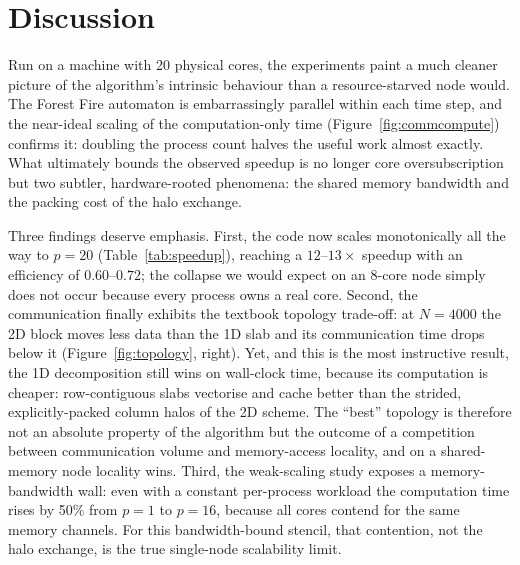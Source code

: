 \section{Discussion}
Run on a machine with 20 physical cores, the experiments paint a much cleaner picture of the algorithm's intrinsic behaviour than a resource-starved node would. The Forest Fire automaton is embarrassingly parallel within each time step, and the near-ideal scaling of the computation-only time (Figure~\ref{fig:commcompute}) confirms it: doubling the process count halves the useful work almost exactly. What ultimately bounds the observed speedup is no longer core oversubscription but two subtler, hardware-rooted phenomena: the shared memory bandwidth and the packing cost of the halo exchange.

Three findings deserve emphasis. First, the code now scales monotonically all the way to $p = 20$ (Table~\ref{tab:speedup}), reaching a $12$--$13\times$ speedup with an efficiency of $0.60$--$0.72$; the collapse we would expect on an 8-core node simply does not occur because every process owns a real core. Second, the communication finally exhibits the textbook topology trade-off: at $N = 4000$ the 2D block moves less data than the 1D slab and its communication time drops below it (Figure~\ref{fig:topology}, right). Yet, and this is the most instructive result, the 1D decomposition still wins on wall-clock time, because its computation is cheaper: row-contiguous slabs vectorise and cache better than the strided, explicitly-packed column halos of the 2D scheme. The ``best'' topology is therefore not an absolute property of the algorithm but the outcome of a competition between communication volume and memory-access locality, and on a shared-memory node locality wins. Third, the weak-scaling study exposes a memory-bandwidth wall: even with a constant per-process workload the computation time rises by 50\% from $p=1$ to $p=16$, because all cores contend for the same memory channels. For this bandwidth-bound stencil, that contention, not the halo exchange, is the true single-node scalability limit.

